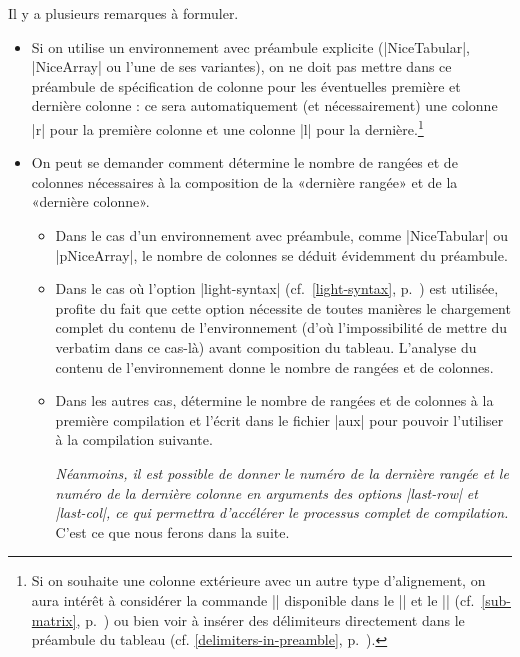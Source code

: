 \documentclass[dvipsnames]{article}
\begin{document}
\medbreak
Il y a plusieurs remarques à formuler.
%
\begin{itemize}[beginpenalty=10000]
\item Si on utilise un environnement avec préambule explicite (|{NiceTabular}|,
|{NiceArray}| ou l'une de ses variantes), on ne doit pas mettre dans ce
préambule de spécification de colonne pour les éventuelles première et dernière
colonne : ce sera automatiquement (et nécessairement) une colonne |r| pour la
première colonne et une colonne |l| pour la dernière.\footnote{Si on souhaite
  une colonne extérieure avec un autre type d'alignement, on aura intérêt à
  considérer la commande |\SubMatrix| disponible dans le |\CodeAfter| et le
  |\CodeBefore| (cf.~\ref{sub-matrix}, p.~\pageref{sub-matrix}) ou bien voir à
  insérer des délimiteurs directement dans le préambule du tableau (cf.
  \ref{delimiters-in-preamble}, p.~\pageref{delimiters-in-preamble}).}

\item On peut se demander comment  détermine le nombre de
rangées et de colonnes nécessaires à la composition de la «dernière rangée» et
de la «dernière colonne».

\begin{itemize}
\item Dans le cas d'un environnement avec préambule, comme |{NiceTabular}| ou
|{pNiceArray}|, le nombre de colonnes se déduit évidemment du préambule.

\item Dans le cas où l'option |light-syntax| (cf.~\ref{light-syntax},
p.~\pageref{light-syntax}) est utilisée,  profite du fait que
cette option nécessite de toutes manières le chargement complet du contenu de
l'environnement (d'où l'impossibilité de mettre du verbatim dans ce cas-là)
avant composition du tableau. L'analyse du contenu de l'environnement donne le
nombre de rangées et de colonnes.

\item Dans les autres cas,  détermine le nombre de rangées et de
colonnes à la première compilation et l'écrit dans le fichier |aux| pour
pouvoir l'utiliser à la compilation suivante.

\textsl{Néanmoins, il est possible de donner le numéro de la dernière rangée et
  le numéro de la dernière colonne en arguments des options |last-row| et
  |last-col|, ce qui permettra d'accélérer le processus complet de compilation.}
C'est ce que nous ferons dans la suite.
\end{itemize}

\end{itemize}
\end{document}

